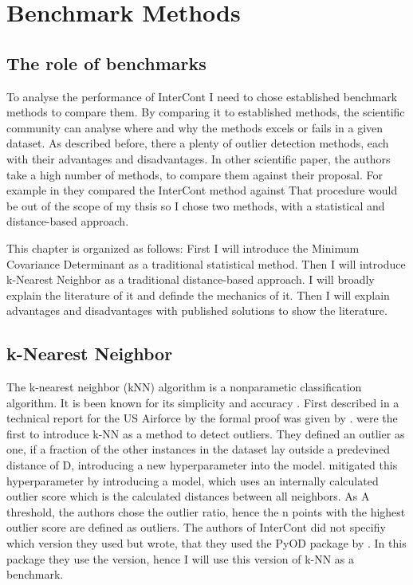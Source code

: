 \section{Benchmark Methods}


\subsection{The role of benchmarks}
To analyse the performance of InterCont I need to chose established benchmark methods to compare them.
By comparing it to established methods, the scientific community can analyse where and why the methods excels or fails in a given dataset.
As described before, there a plenty of outlier detection methods, each with their advantages and disadvantages.
In other scientific paper, the authors take a high number of methods, to compare them against their proposal. 
For example in \citep{shenkar2022anomaly} they compared the InterCont method against
That procedure would be out of the scope of my thsis so I chose two methods, with a statistical and distance-based approach.


This chapter is organized as follows: 
First I will introduce the Minimum Covariance Determinant as a traditional statistical method.
Then I will introduce k-Nearest Neighbor as a traditional distance-based approach. 
I will broadly explain the literature of it and definde the mechanics of it. 
Then I will explain advantages and disadvantages with published solutions to show the literature.


\subsection{k-Nearest Neighbor }
The k-nearest neighbor (kNN) algorithm is a nonparametic classification algorithm. 
It is been known for its simplicity and accuracy .
First described in a technical report for the US Airforce by  \citet{fix1951discriminatory} the formal proof was given by \citet{1053964}.
\citet{knox1998algorithms} were the first to introduce k-NN as a method to detect outliers. 
They defined an outlier as one, if a fraction of the other instances in the dataset lay outside a predevined distance of D, introducing a new hyperparameter into the model.
\citet{ramaswamy2000efficient} mitigated this hyperparameter by introducing a model, which uses an internally calculated outlier score which is the calculated distances between all neighbors. 
As A threshold, the authors chose the outlier ratio, hence the n points with the highest outlier score are defined as outliers. 
The authors of InterCont did not specifiy which version they used but wrote, that they used the PyOD package by \citet{zhao2019pyod}.
In this package they use the \citet{ramaswamy2000efficient} version, hence I will use this version of k-NN as a benchmark.


